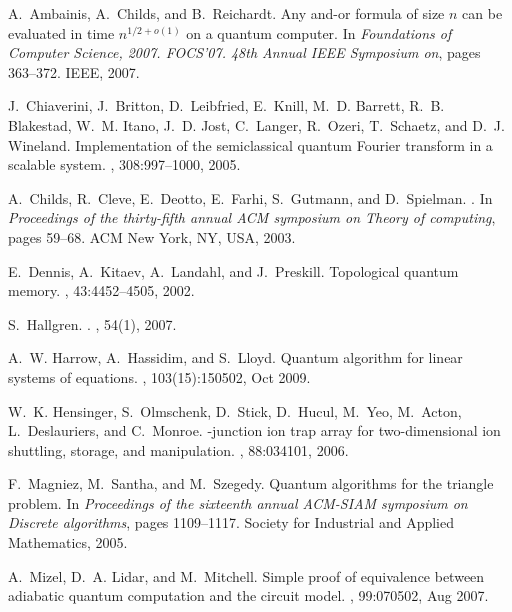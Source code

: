 \documentclass{article}
\begin{document}
\begin{thebibliography}{10}

A.~Ambainis, A.~Childs, and B.~Reichardt.
\newblock Any and-or formula of size $n$ can be evaluated in time $n^{1/2+ o
  (1)}$ on a quantum computer.
\newblock In {\em Foundations of Computer Science, 2007. FOCS'07. 48th Annual
  IEEE Symposium on}, pages 363--372. IEEE, 2007.

J.~Chiaverini, J.~Britton, D.~Leibfried, E.~Knill, M.~D. Barrett, R.~B.
  Blakestad, W.~M. Itano, J.~D. Jost, C.~Langer, R.~Ozeri, T.~Schaetz, and
  D.~J. Wineland.
\newblock Implementation of the semiclassical quantum {Fourier} transform in a
  scalable system.
, 308:997--1000, 2005.

A.~Childs, R.~Cleve, E.~Deotto, E.~Farhi, S.~Gutmann, and D.~Spielman.
.
\newblock In {\em Proceedings of the thirty-fifth annual ACM symposium on
  Theory of computing}, pages 59--68. ACM New York, NY, USA, 2003.

E.~Dennis, A.~Kitaev, A.~Landahl, and J.~Preskill.
\newblock Topological quantum memory.
, 43:4452--4505, 2002.

S.~Hallgren.
.
, 54(1), 2007.

A.~W. Harrow, A.~Hassidim, and S.~Lloyd.
\newblock Quantum algorithm for linear systems of equations.
, 103(15):150502, Oct 2009.

W.~K. Hensinger, S.~Olmschenk, D.~Stick, D.~Hucul, M.~Yeo, M.~Acton,
  L.~Deslauriers, and C.~Monroe.
-junction ion trap array for two-dimensional ion shuttling,
  storage, and manipulation.
, 88:034101, 2006.

F.~Magniez, M.~Santha, and M.~Szegedy.
\newblock Quantum algorithms for the triangle problem.
\newblock In {\em Proceedings of the sixteenth annual ACM-SIAM symposium on
  Discrete algorithms}, pages 1109--1117. Society for Industrial and Applied
  Mathematics, 2005.

A.~Mizel, D.~A. Lidar, and M.~Mitchell.
\newblock Simple proof of equivalence between adiabatic quantum computation and
  the circuit model.
, 99:070502, Aug 2007.


\end{thebibliography}
\end{document}
